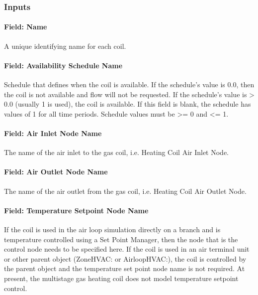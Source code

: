 \subsubsection{Inputs}\label{inputs-11-005}

\paragraph{Field: Name}\label{field-name-10-005}

A unique identifying name for each coil.

\paragraph{Field: Availability Schedule Name}\label{field-availability-schedule-name-5-001}

Schedule that defines when the coil is available. If the schedule's value is 0.0, then the coil is not available and flow will not be requested. If the schedule's value is \textgreater{} 0.0 (usually 1 is used), the coil is available. If this field is blank, the schedule has values of 1 for all time periods. Schedule values must be \textgreater{}= 0 and \textless{}= 1.

\paragraph{Field: Air Inlet Node Name}\label{field-air-inlet-node-name-7}

The name of the air inlet to the gas coil, i.e. Heating Coil Air Inlet Node.

\paragraph{Field: Air Outlet Node Name}\label{field-air-outlet-node-name-7-000}

The name of the air outlet from the gas coil, i.e. Heating Coil Air Outlet Node.

\paragraph{Field: Temperature Setpoint Node Name}\label{field-temperature-setpoint-node-name-5}

If the coil is used in the air loop simulation directly on a branch and is temperature controlled using a Set Point Manager, then the node that is the control node needs to be specified here. If the coil is used in an air terminal unit or other parent object (ZoneHVAC: or AirloopHVAC:), the coil is controlled by the parent object and the temperature set point node name is not required. At present, the multistage gas heating coil does not model temperature setpoint control.

